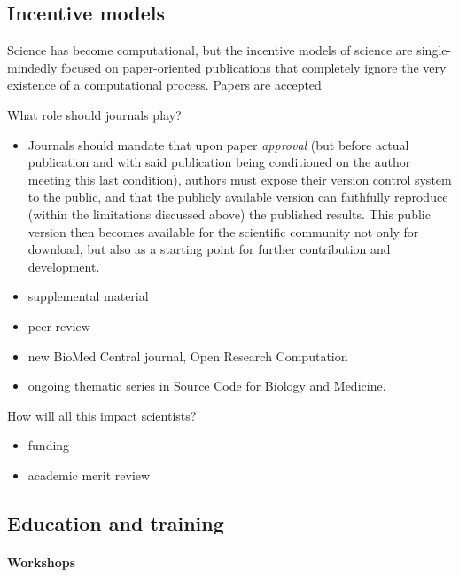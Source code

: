 \documentclass[ChapterTOCs,krantz2]{krantz} %
\begin{document}
\subsection{Incentive models}

Science has become computational, but the incentive models of science
are single-mindedly focused on paper-oriented publications that completely
ignore the very existence of a computational process. Papers are accepted 

What role should journals play?

\begin{itemize}
\item Journals should mandate that upon paper \emph{approval} (but before
actual publication and with said publication being conditioned on
the author meeting this last condition), authors must expose their
version control system to the public, and that the publicly available
version can faithfully reproduce (within the limitations discussed
above) the published results. This public version then becomes available
for the scientific community not only for download, but also as a
starting point for further contribution and development.

\item supplemental material

\item peer review

\item new BioMed Central journal, Open Research Computation

 \item ongoing thematic series in Source Code for Biology and Medicine.
\cite{neylon2012changing}

\end{itemize}

How will all this impact scientists?

\begin{itemize}

\item funding
\item academic merit review

\end{itemize}

\subsection{Education and training}

\paragraph{ {\bf Workshops}}
\end{document}
